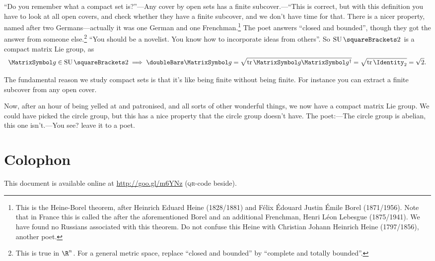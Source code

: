 \documentclass[10pt, a4paper, twoside]{lecturenotes}
\newcommand{\Rn}{{\R^n}}
\begin{document}
\begin{lecture}[date=2013-04-23]
``Do you remember what a compact set is?''---Any cover by open sets has a finite subcover.---``This is correct, but with this definition you have to look at all open covers, and check whether they have a finite subcover, and we don't have time for that. There is a nicer property, named after two Germans---actually it was one German and one Frenchman.\footnote{This is the Heine-Borel theorem, after Heinrich Eduard Heine (1828/1881) and Félix Édouard Justin Émile Borel (1871/1956). Note that in France this is called the  after the aforementioned Borel and an additional Frenchman, Henri Léon Lebesgue (1875/1941). We have found no Russians associated with this theorem. Do not confuse this Heine with Christian Johann Heinrich Heine (1797/1856), another poet.} The poet answers ``closed and bounded'', though they got the answer from someone else.\footnote{This is true in $\Rn$. For a general metric space, replace ``closed and bounded'' by ``complete and totally bounded''.} ``You should be a novelist. You know how to incorporate ideas from others''. So $\SpecialUnitaryGroup\of{2}$ is a compact matrix Lie group, as \[
\matg\in\SpecialUnitaryGroup\of 2 \Implies \FrobeniusNorm\matg = \sqrt{\Trace \matg\adj\matg} = \sqrt{\Trace \Identity_2} = \sqrt{2}\text.
\]

The fundamental reason we study compact sets is that it's like being finite without being finite. For instance you can extract a finite subcover from any open cover.

Now, after an hour of being yelled at and patronised, and all sorts of other wonderful things,  we now have a compact matrix Lie group. We could have picked the circle group, but this has a nice property that the circle group doesn't have. The poet:---The circle group is abelian, this one isn't.---You see? leave it to a poet.
\end{lecture}

\endgroup%

\appendix
\newpage
\section*{Colophon}
This document is available online at \url{http://goo.gl/m6YNz} (\textsc{qr}-code beside).
\end{document}
